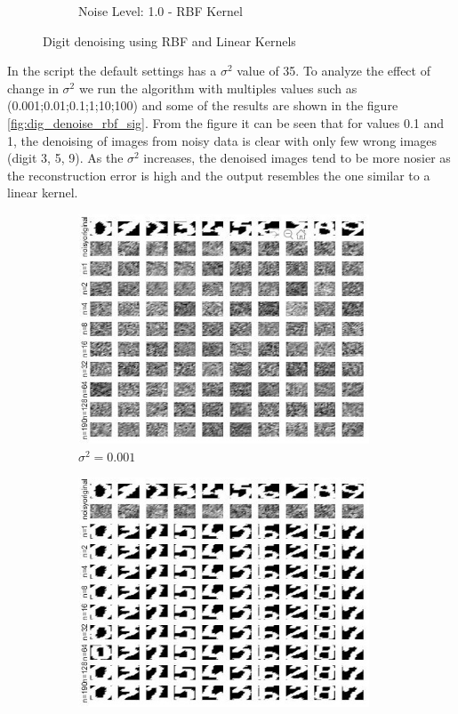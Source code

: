 \begin{figure}[!htpb]
\begin{subfigure}[b]{0.4\textwidth}
		\caption{Noise Level: 1.0 - RBF Kernel}\label{fig:dig_denoise_rbf}
	\end{subfigure}%
	\caption{Digit denoising using RBF and Linear Kernels}
	\label{fig:dig_denoise}
\end{figure}
In the script the default settings has a $\sigma^2$ value of 35. To analyze the effect of change in $\sigma^2$ we run the algorithm with multiples values such as (0.001;0.01;0.1;1;10;100) and some of the results are shown in the figure \ref{fig:dig_denoise_rbf_sig}. From the figure it can be seen that for values 0.1 and 1, the denoising of images from noisy data is clear with only few wrong images (digit 3, 5, 9). As the $\sigma^2$ increases, the denoised images tend to be more nosier as the reconstruction error is high and the output resembles the one similar to a linear kernel.  
\begin{figure}[!htpb]
	\begin{subfigure}[b]{0.25\textwidth}
		\centering
		\includegraphics[height= 0.75\textwidth, width = 0.95\textwidth]{Exercise3/Report/dig_denoise_rbf_sig_0.1}
		\caption{$\sigma^2 = 0.001$ }\label{fig:dig_denoise_rbf_sig_0.1}
	\end{subfigure}%
	\begin{subfigure}[b]{0.25\textwidth}
		\centering
		\includegraphics[height= 0.75\textwidth, width = 0.95\textwidth]{Exercise3/Report/dig_denoise_rbf_sig_1}

\end{subfigure}
\end{figure}
